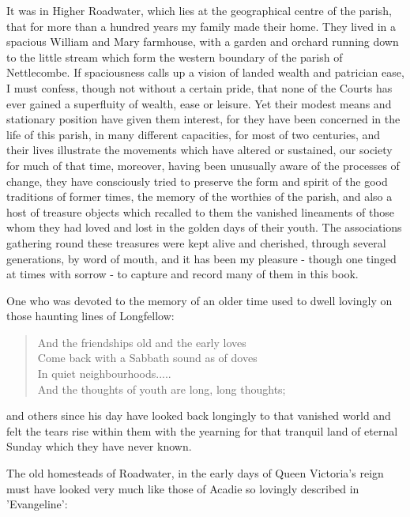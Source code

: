 
It was in Higher Roadwater, which lies at the geographical centre of the parish, that for more than a hundred years my family made their home. They lived in a spacious William and Mary farmhouse, with a garden and orchard running down to the little stream which form the western boundary of the parish of Nettlecombe. If spaciousness calls up a vision of landed wealth and patrician ease, I must confess, though not without a certain pride, that none of the Courts has ever gained a superfluity of wealth, ease or leisure. Yet their modest means and stationary position have given them interest, for they have been concerned in the life of this parish, in many different capacities, for most of two centuries, and their lives illustrate the movements which have altered or sustained, our society for much of that time, moreover, having been unusually aware of the processes of change, they have consciously tried to preserve the form and spirit of the good traditions of former times, the memory of the worthies of the parish, and also a host of treasure objects which recalled to them the vanished lineaments of those whom they had loved and lost in the golden days of their youth. The associations gathering round these treasures were kept alive and cherished, through several generations, by word of mouth, and it has been my pleasure - though one tinged at times with sorrow - to capture and record many of them in this book.

One who was devoted to the memory of an older time used to dwell lovingly on those haunting lines of Longfellow:

\begin{quote}
And the friendships old and the early loves \\
Come back with a Sabbath sound as of doves \\
In quiet neighbourhoods..... \\
And the thoughts of youth are long, long thoughts;
\end{quote}

and others since his day have looked back longingly to that vanished world and felt the tears rise within them with the yearning for that tranquil land of eternal Sunday which they have never known.

\Flourish 

The old homesteads of Roadwater, in the early days of Queen Victoria’s reign must have looked very much like those of Acadie so lovingly described in ’Evangeline’:

